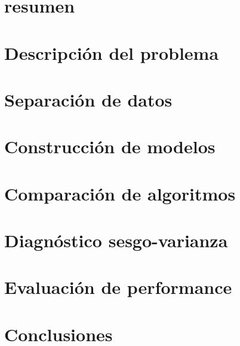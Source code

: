 \documentclass{./packages/informe}
\begin{document}
 



\section*{resumen}


\vspace{1em}
\tableofcontents
\newpage

\section{Descripción del problema}


\section{Separación de datos}


\section{Construcción de modelos}


\vspace{1em}
\section{Comparación de algoritmos}\label{algoritmos}


\vspace{1em}
\section{Diagnóstico sesgo-varianza}


\vspace{1em}
\section{Evaluación de performance}


\vspace{1em}
\section{Conclusiones}


% 

\newpage


\end{document}
